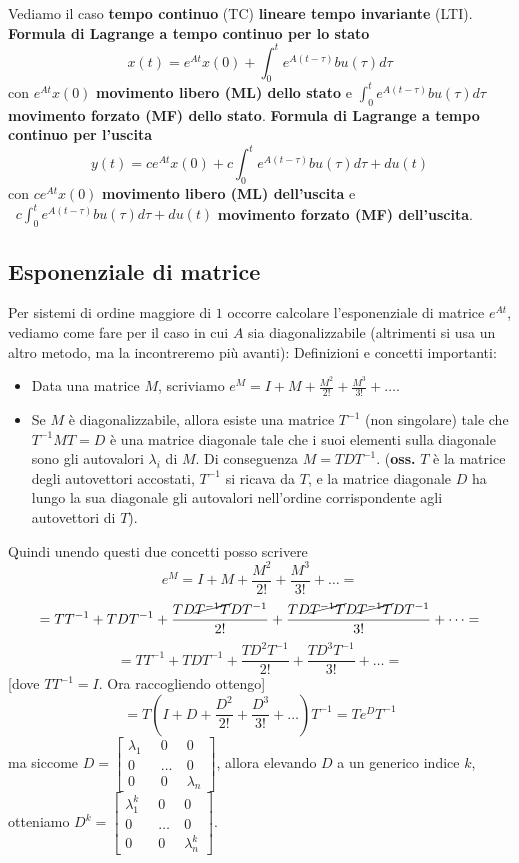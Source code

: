 \newline
Vediamo il caso \textbf{tempo continuo} (TC) \textbf{lineare tempo invariante} (LTI).\newline
\textbf{Formula di Lagrange a tempo continuo per lo stato}
\[
    x(t) = e^{At}x(0) + \int_{0}^{t}e^{A(t-\tau)}bu(\tau)d \tau
\]
con $e^{At}x(0)$ \textbf{movimento libero (ML) dello stato} e $\int_{0}^{t}e^{A(t-\tau)}bu(\tau)d \tau$ \textbf{movimento forzato (MF) dello stato}.\newline
\textbf{Formula di Lagrange a tempo continuo per l'uscita}
\[
    y(t) = c e^{At}x(0) + c\int_{0}^{t}e^{A(t-\tau)}bu(\tau)d \tau + du(t)
\]
con $ce^{At}x(0)$ \textbf{movimento libero (ML) dell'uscita} e $\;\; c\int_{0}^{t}e^{A(t-\tau)}bu(\tau)d \tau + du(t)$ \textbf{movimento forzato (MF) dell'uscita}.
\subsection{Esponenziale di matrice}
Per sistemi di ordine maggiore di $1$ occorre calcolare l'esponenziale di matrice $e^{At}$, vediamo come fare per il caso in cui $A$ sia diagonalizzabile (altrimenti si usa un altro metodo, ma la incontreremo più avanti):\newline
Definizioni e concetti importanti:
\begin{itemize}
    \item Data una matrice $M$, scriviamo $e^M = I + M + \frac{M^2}{2!} + \frac{M^3}{3!}+\dots$.
    \item Se $M$ è diagonalizzabile, allora esiste una matrice $T^{-1}$ (non singolare) tale che $T^{-1} M T = D$ è una matrice diagonale tale che i suoi elementi sulla diagonale sono gli autovalori $\lambda_i$ di $M$. Di conseguenza $M = T D T^{-1}$.\newline
    (\textbf{oss.} $T$ è la matrice degli autovettori accostati, $T^{-1}$ si ricava da $T$, e la matrice diagonale $D$ ha lungo la sua diagonale gli autovalori nell'ordine corrispondente agli autovettori di $T$).
\end{itemize}
Quindi unendo questi due concetti posso scrivere
\[
    e^M = I + M + \frac{M^2}{2!} + \frac{M^3}{3!}+\dots=
\]
\[
    = TT^{-1} + T D T^{-1} + \frac{TD\cancel{T^{-1} T}DT^{-1}}{2!} + \frac{TD \cancel{T^{-1} T}D \cancel{T^{-1} T}DT^{-1}}{3!} + \dots =
\]
\[
    = TT^{-1} + T D T^{-1} + \frac{TD^2T^{-1}}{2!} + \frac{TD^3T^{-1}}{3!} + \dots=
\]
[dove $TT^{-1} = I$. Ora raccogliendo ottengo]
\[
    = T(I + D + \frac{D^2}{2!} + \frac{D^3}{3!} + \dots)T^{-1} = T e^{D}T^{-1}
\]
ma siccome $D = \left[\begin{matrix}
    \lambda_1 \;\; &0 \;\; &0\\
    0 & \dots &0\\
    0 &0 & \lambda_n
\end{matrix}\right]$, allora elevando $D$ a un generico indice $k$, otteniamo $D^k= \left[\begin{matrix}
    \lambda_1^k \;\; &0 \;\; &0\\
    0 & \dots &0\\
    0 &0 & \lambda_n^k
\end{matrix}\right]$.\newline
